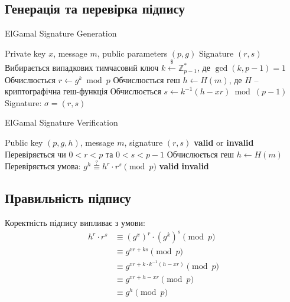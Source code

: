 \subsection{Генерація та перевірка підпису}

\begin{algorithm}
    \caption{ElGamal Signature Generation}
    \begin{algorithmic}[1]
        \Require Private key $x$, message $m$, public parameters $(p, g)$
        \Ensure Signature $(r, s)$
        \State Вибирається випадкових тимчасовий ключ $k \xleftarrow{\$} \mathbb{Z}_{p-1}^*$, де $\gcd(k, p-1) = 1$
        \State Обчислюється $r \gets g^k \bmod p$
        \State Обчислюється геш $h \gets H(m)$, де $H$ -- криптографічна геш-функція
        \State Обчислюється $s \gets k^{-1}(h - xr) \bmod (p-1)$
        \State \Return Signature: $\sigma = (r, s)$
    \end{algorithmic}
\end{algorithm}

\begin{algorithm}
    \caption{ElGamal Signature Verification}
    \begin{algorithmic}[1]
        \Require Public key $(p, g, h)$, message $m$, signature $(r, s)$
        \Ensure \textbf{valid} or \textbf{invalid}
        \State Перевіряється чи $0 < r < p$ та $0 < s < p-1$
        \State Обчислюється геш $h \gets H(m)$
        \State Перевіряється умова: $g^h \stackrel{?}{\equiv} h^r \cdot r^s \pmod{p}$
        \State \Return \textbf{valid}
        \Else
        \State \Return \textbf{invalid}
        \EndIf
    \end{algorithmic}
\end{algorithm}

\subsection{Правильність підпису}

Коректність підпису випливає з умови:
\begin{align*}
    h^r \cdot r^s & \equiv (g^x)^r \cdot (g^k)^s \pmod{p}           \\
                  & \equiv g^{xr + ks} \pmod{p}                     \\
                  & \equiv g^{xr + k \cdot k^{-1}(h - xr)} \pmod{p} \\
                  & \equiv g^{xr + h - xr} \pmod{p}                 \\
                  & \equiv g^h \pmod{p}
\end{align*}

